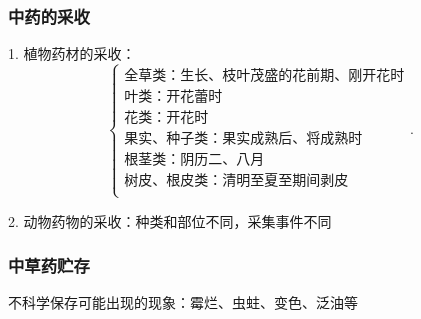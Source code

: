 \subsubsection*{中药的采收}%
\label{subsub:中药的采收}
1. 植物药材的采收：
\[
    \begin{cases}
        \mbox{全草类：生长、枝叶茂盛的花前期、刚开花时}\\ 
        \mbox{叶类：开花蕾时}\\ 
        \mbox{花类：开花时}\\ 
        \mbox{果实、种子类：果实成熟后、将成熟时}\\ 
        \mbox{根茎类：阴历二、八月}\\ 
        \mbox{树皮、根皮类：清明至夏至期间剥皮}\\ 
    \end{cases}
.\] 

2. 动物药物的采收：种类和部位不同，采集事件不同

\subsubsection*{中草药贮存}%
\label{subsub:中草药贮存}
\begin{notation}
    不科学保存可能出现的现象：霉烂、虫蛀、变色、泛油等
\end{notation}
